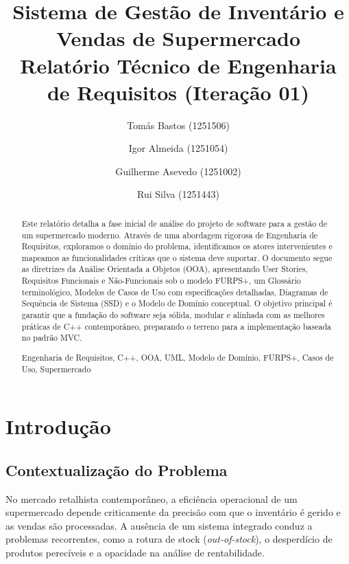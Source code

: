 \documentclass[runningheads,a4paper]{llncs}
\newcommand{\keywords}[1]{\par\addvspace\baselineskip
\noindent\keywordname\enspace\ignorespaces#1}
\begin{document}
\mainmatter

\title{Sistema de Gestão de Inventário e Vendas de Supermercado\\
{\small Relatório Técnico de Engenharia de Requisitos (Iteração 01)}}

\author{Tomás Bastos (1251506) \and Igor Almeida (1251054) \and Guilherme Asevedo (1251002) \and Rui Silva (1251443)}


\maketitle

\begin{abstract}
Este relatório detalha a fase inicial de análise do projeto de software para a gestão de um supermercado moderno. Através de uma abordagem rigorosa de Engenharia de Requisitos, exploramos o domínio do problema, identificamos os atores intervenientes e mapeamos as funcionalidades críticas que o sistema deve suportar. O documento segue as diretrizes da Análise Orientada a Objetos (OOA), apresentando User Stories, Requisitos Funcionais e Não-Funcionais sob o modelo FURPS+, um Glossário terminológico, Modelos de Casos de Uso com especificações detalhadas, Diagramas de Sequência de Sistema (SSD) e o Modelo de Domínio conceptual. O objetivo principal é garantir que a fundação do software seja sólida, modular e alinhada com as melhores práticas de C++ contemporâneo, preparando o terreno para a implementação baseada no padrão MVC.
\keywords{Engenharia de Requisitos, C++, OOA, UML, Modelo de Domínio, FURPS+, Casos de Uso, Supermercado}
\end{abstract}

\newpage

\section{Introdução}

\subsection{Contextualização do Problema}
No mercado retalhista contemporâneo, a eficiência operacional de um supermercado depende criticamente da precisão com que o inventário é gerido e as vendas são processadas. A ausência de um sistema integrado conduz a problemas recorrentes, como a rotura de stock (\textit{out-of-stock}), o desperdício de produtos perecíveis e a opacidade na análise de rentabilidade.
\end{document}

